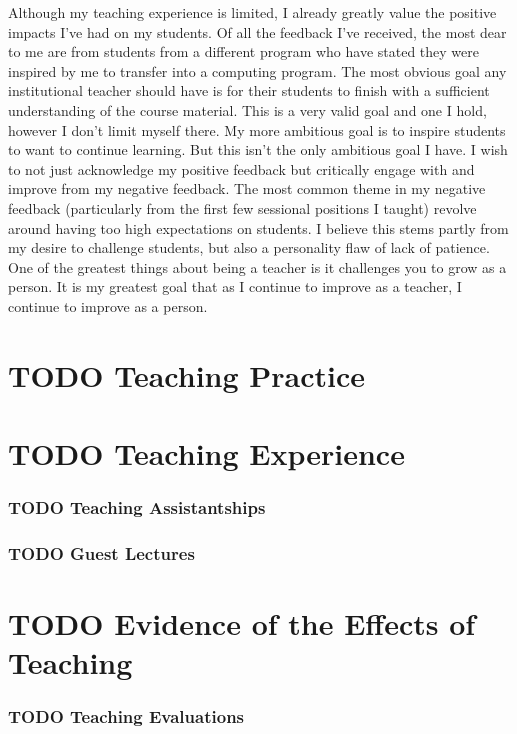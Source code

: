 \documentclass[12pt]{report}
\begin{document}
Although my teaching experience is limited, I already greatly value the
positive impacts I've had on my students. Of all the feedback I've received,
the most dear to me are from students from a different program who have stated
they were inspired by me to transfer into a computing program. The most
obvious goal any institutional teacher should have is for their students to
finish with a sufficient understanding of the course material. This is a very
valid goal and one I hold, however I don't limit myself there. My more
ambitious goal is to inspire students to want to continue learning. But this
isn't the only ambitious goal I have. I wish to not just acknowledge my
positive feedback but critically engage with and improve from my negative
feedback. The most common theme in my negative feedback (particularly from the
first few sessional positions I taught) revolve around having too high
expectations on students. I believe this stems partly from my desire to
challenge students, but also a personality flaw of lack of patience. One of
the greatest things about being a teacher is it challenges you to grow as a
person. It is my greatest goal that as I continue to improve as a teacher, I
continue to improve as a person.

\part{{\bfseries\sffamily TODO} Teaching Practice}
\label{sec:org69ff924}
\part{{\bfseries\sffamily TODO} Teaching Experience}
\label{sec:org380f684}
\section{{\bfseries\sffamily TODO} Teaching Assistantships}
\label{sec:org9f98ab5}
\section{{\bfseries\sffamily TODO} Guest Lectures}
\label{sec:orge4b0fb2}
\part{{\bfseries\sffamily TODO} Evidence of the Effects of Teaching}
\label{sec:org9a5e985}
\section{{\bfseries\sffamily TODO} Teaching Evaluations}
\label{sec:orgdf452a1}
\end{document}
